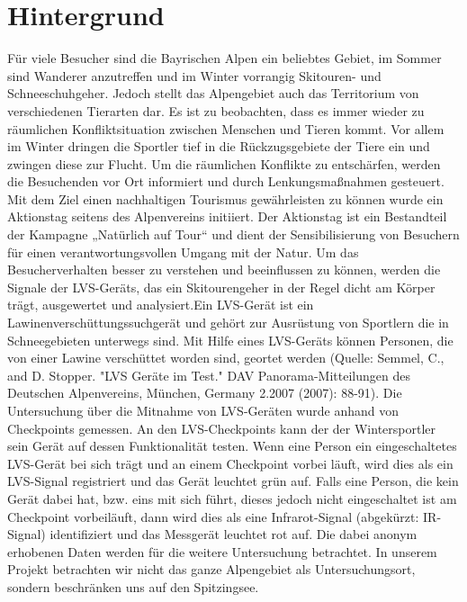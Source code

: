\chapter{Hintergrund}

Für viele Besucher sind die Bayrischen Alpen ein beliebtes Gebiet, im Sommer sind Wanderer anzutreffen und im Winter vorrangig Skitouren- und Schneeschuhgeher. Jedoch stellt das Alpengebiet auch das Territorium von verschiedenen Tierarten dar. Es ist zu beobachten, dass es immer wieder zu räumlichen Konfliktsituation zwischen Menschen und Tieren kommt. Vor allem im Winter dringen die Sportler tief in die Rückzugsgebiete der Tiere ein und zwingen diese zur Flucht. Um die räumlichen Konflikte zu entschärfen, werden die Besuchenden vor Ort informiert und durch Lenkungsmaßnahmen gesteuert. Mit dem Ziel einen nachhaltigen Tourismus gewährleisten zu können wurde ein Aktionstag seitens des Alpenvereins initiiert. Der Aktionstag ist ein Bestandteil der Kampagne „Natürlich auf Tour“ und dient der Sensibilisierung von Besuchern für einen verantwortungsvollen Umgang mit der Natur. 
   Um das Besucherverhalten besser zu verstehen und beeinflussen zu können, werden die Signale der LVS-Geräts, das ein Skitourengeher in der Regel dicht am Körper trägt, ausgewertet und analysiert.Ein LVS-Gerät ist ein Lawinenverschüttungssuchgerät und gehört zur Ausrüstung von Sportlern die in Schneegebieten unterwegs sind. Mit Hilfe eines LVS-Geräts können Personen, die von einer Lawine verschüttet worden sind, geortet werden (Quelle: Semmel, C., and D. Stopper. "LVS Geräte im Test." DAV Panorama-Mitteilungen des Deutschen Alpenvereins, München, Germany 2.2007 (2007): 88-91). Die Untersuchung über die Mitnahme von LVS-Geräten wurde anhand von Checkpoints gemessen. An den LVS-Checkpoints kann der der Wintersportler sein Gerät auf dessen Funktionalität testen. Wenn eine Person ein eingeschaltetes LVS-Gerät bei sich trägt und an einem Checkpoint vorbei läuft, wird dies als ein LVS-Signal registriert und das Gerät leuchtet grün auf. Falls eine Person, die kein Gerät dabei hat, bzw. eins mit sich führt, dieses jedoch nicht eingeschaltet ist am Checkpoint vorbeiläuft, dann wird dies als eine Infrarot-Signal (abgekürzt: IR-Signal) identifiziert und das Messgerät leuchtet rot auf. Die dabei anonym erhobenen Daten werden für die weitere Untersuchung betrachtet. 
   In unserem Projekt betrachten wir nicht das ganze Alpengebiet als Untersuchungsort, sondern beschränken uns auf den Spitzingsee. 
